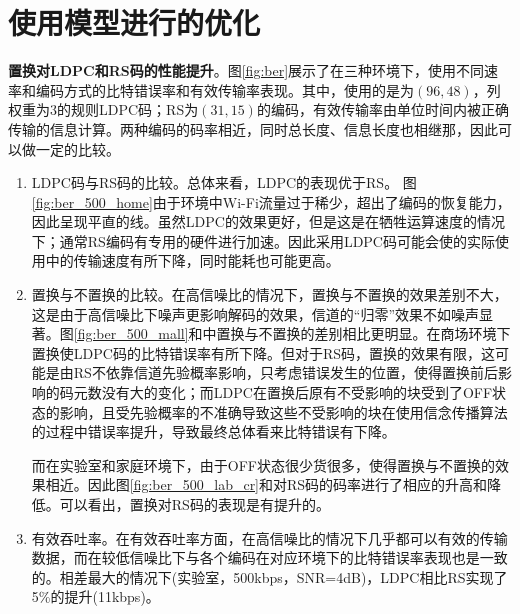 \section{使用模型进行的优化}

\textbf{置换对LDPC和RS码的性能提升}。图\ref{fig:ber}展示了在三种环境下，使用不同速率和编码方式的比特错误率和有效传输率表现。其中，使用的是为$(96,48)$，列权重为$3$的规则LDPC码；RS为$(31,15)$的编码，有效传输率由单位时间内被正确传输的信息计算。两种编码的码率相近，同时总长度、信息长度也相继那，因此可以做一定的比较。

\begin{enumerate}
	\item LDPC码与RS码的比较。总体来看，LDPC的表现优于RS。
	图\ref{fig:ber_500_home}由于环境中Wi-Fi流量过于稀少，超出了编码的恢复能力，因此呈现平直的线。虽然LDPC的效果更好，但是这是在牺牲运算速度的情况下；通常RS编码有专用的硬件进行加速。因此采用LDPC码可能会使的实际使用中的传输速度有所下降，同时能耗也可能更高。
	
	\item 置换与不置换的比较。在高信噪比的情况下，置换与不置换的效果差别不大，这是由于高信噪比下噪声更影响解码的效果，信道的“归零”效果不如噪声显著。图\ref{fig:ber_500_mall}和中置换与不置换的差别相比更明显。在商场环境下置换使LDPC码的比特错误率有所下降。但对于RS码，置换的效果有限，这可能是由RS不依靠信道先验概率影响，只考虑错误发生的位置，使得置换前后影响的码元数没有大的变化；而LDPC在置换后原有不受影响的块受到了OFF状态的影响，且受先验概率的不准确导致这些不受影响的块在使用信念传播算法的过程中错误率提升，导致最终总体看来比特错误有下降。
	
	而在实验室和家庭环境下，由于OFF状态很少货很多，使得置换与不置换的效果相近。因此图\ref{fig:ber_500_lab_cr}和对RS码的码率进行了相应的升高和降低。可以看出，置换对RS码的表现是有提升的。
	
	\item 有效吞吐率。在有效吞吐率方面，在高信噪比的情况下几乎都可以有效的传输数据，而在较低信噪比下与各个编码在对应环境下的比特错误率表现也是一致的。相差最大的情况下(实验室，500kbps，SNR=4dB)，LDPC相比RS实现了5\%的提升(11kbps)。
\end{enumerate}

